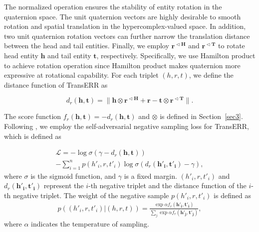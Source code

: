 \documentclass[10pt, a4paper]{article}
\begin{document}
The normalized operation ensures the stability of entity rotation in the quaternion space. The unit quaternion vectors are highly desirable to smooth rotation and spatial translation in the hypercomplex-valued space. In addition, two unit quaternion rotation vectors can further narrow the translation distance between the head and tail entities. Finally, we employ $\mathbf{r^{\vartriangleleft H}}$ and $\mathbf{r^{\vartriangleleft T}}$ to rotate head entity $\mathbf{h}$ and tail entity $\mathbf{t}$, respectively. Specifically, we use Hamilton product to achieve rotation operation since Hamilton product makes quaternion more expressive at rotational capability. For each triplet $(h, r, t)$, we define the distance function of TransERR as

\begin{equation}
	d_r(\mathbf{h},\mathbf{t}) = \parallel \mathbf{h} \otimes \mathbf{r^{\vartriangleleft H}} + \mathbf{r}- \mathbf{t} \otimes \mathbf{r^{\vartriangleleft T}}   \parallel.
\end{equation}

The score function $f_r(\mathbf{h},\mathbf{t}) = - d_r(\mathbf{h},\mathbf{t})$ and $\otimes$ is defined in Section~\ref{sec3}. Following \citet{31sun2019rotate}, we employ the self-adversarial negative sampling loss for TransERR, which is defined as


\begin{equation}
	\begin{aligned}
		\mathcal{L} = -\log \sigma (\gamma -d_r(\mathbf{h},\mathbf{t})) \\ - \sum_{i = 1}^{n}p(h'_i,r,t'_i)\log\sigma(d_r(\mathbf{h'_i},\mathbf{t'_i})-\gamma),
	\end{aligned}
\end{equation}
where $\sigma$ is the sigmoid function, and $\gamma$ is a fixed margin. $(h'_i,r,t'_i)$ and $d_r(\mathbf{h'_i},\mathbf{t'_i})$ represent the $i$-th negative triplet and the distance function of the $i$-th negative triplet. The weight of the negative sample $p(h'_i,r,t'_i)$ is defined as
\begin{equation}
  \begin{aligned}
    p((h'_i,r,t'_i)|(h,r,t)) = \frac{ \exp \alpha f_r(\mathbf{h'_i},\mathbf{t'_i})}{\sum_{j}\exp \alpha f_r(\mathbf{h'_j},\mathbf{t'_j})},
  \end{aligned}
\end{equation}
where $\alpha$ indicates the temperature of sampling.
\end{document}
